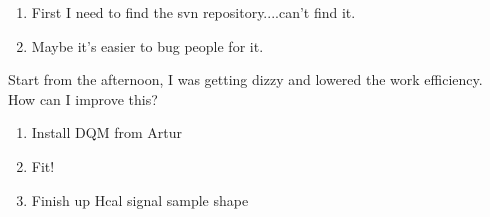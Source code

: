 
\begin{enumerate}
\item First I need to find the svn repository....can't find it.
\item Maybe it's easier to bug people for it.
\end{enumerate}


Start from the afternoon, I was getting dizzy and lowered the work efficiency.  How can I improve this?


\begin{enumerate}
\item Install DQM from Artur
\item Fit!
\item Finish up Hcal signal sample shape
\end{enumerate}


